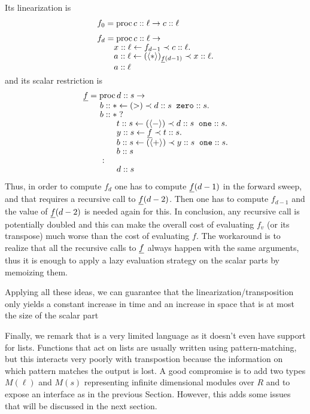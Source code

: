 \begin{itemize}
  Its linearization is 
  \begin{align}
    &f_0 = \operatorname{proc} c::\ell \rightarrow  c::\ell\\[0.5ex]
    \label{eq:mechant-lin}
    &\begin{aligned}
      &f_d = \operatorname{proc} c::\ell \rightarrow\\[-1ex]
      &\qquad x::\ell \leftarrow f_{d-1} \prec c::\ell.\\[-1ex]
      &\qquad a::\ell \leftarrow (\langle*\rangle)_{\underline{f}(d-1)} \prec x::\ell.\\[-1ex]
      &\qquad a::\ell\\[-1ex]
    \end{aligned}
  \end{align}
  and its scalar restriction is
  \begin{equation}
    \begin{aligned}
      &\underline{f} = \operatorname{proc} d::s \rightarrow\\[-1ex]
      &\qquad b::* \leftarrow (>) \prec d::s \;\; \text{\tt zero}::s.\\[-1ex]
      &\qquad b::*\;?\\[-1ex]
      &\qquad\qquad t::s \leftarrow (\langle-\rangle) \prec d::s \;\; \text{\tt one}::s.\\[-1ex]
      &\qquad\qquad y::s \leftarrow \underline{f} \prec t::s.\\[-1ex]
      &\qquad\qquad b::s \leftarrow (\langle+\rangle) \prec y::s\;\;\text{\tt one}::s.\\[-1ex]
      &\qquad\qquad b::s\\[-1ex]
      &\qquad :\\[-1ex]
      &\qquad\qquad d::s
    \end{aligned}
  \end{equation}
  Thus, in order to compute $f_d$ one has to compute $\underline{f}(d-1)$ in
  the forward sweep, and that requires a recursive call to
  $\underline{f}(d-2)$. Then one has to compute $f_{d-1}$ and the value of
  $\underline{f}(d-2)$ is needed again for this. In conclusion, any recursive
  call is potentially doubled and this can make the overall cost of
  evaluating $f_v$ (or its transpose) much worse than the cost of
  evaluating $f$. The workaround is to realize that all the recursive
  calls to $\underline{f}$ always happen with the same arguments, thus it is
  enough to apply a lazy evaluation strategy on the scalar parts by
  memoizing them.
\end{itemize}
Applying all these ideas, we can guarantee that the
linearization/transposition only yields a constant increase in time
and an increase in space that is at most the size of the scalar part

Finally, we remark that \tAL{} is a very limited language as it
doesn't even have support for lists. Functions that act on lists are
usually written using pattern-matching, but this interacts very poorly
with transpostion because the information on which pattern matches the
output is lost. A good compromise is to add two types $M(\ell)$ and
$M(s)$ representing infinite dimensional modules over $R$ and to
expose an interface as in the previous Section. However, this adds
some issues that will be discussed in the next section.


%
